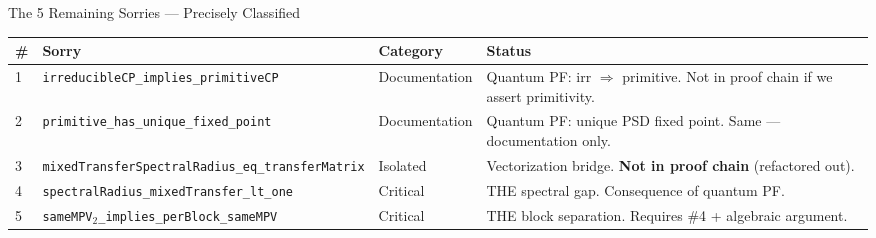 \documentclass[aspectratio=169,10pt]{beamer}
\begin{document}
\begin{frame}{The 5 Remaining Sorries --- Precisely Classified}
\vspace{-0.3em}
\begin{center}
\renewcommand{\arraystretch}{1.25}
{\small
\begin{tabular}{>{\raggedright}p{0.5cm} >{\raggedright}p{4.2cm} >{\raggedright}p{2.2cm} >{\raggedright\arraybackslash}p{4.5cm}}
\hline
\textbf{\#} & \textbf{Sorry} & \textbf{Category} & \textbf{Status} \\
\hline
\textcolor{dimwhite}{1} & \texttt{irreducibleCP\_implies\_\newline primitiveCP} &
  \textcolor{dimwhite}{Documentation} & {\scriptsize Quantum PF: irr $\Rightarrow$ primitive. Not in proof chain if we assert primitivity.} \\
\textcolor{dimwhite}{2} & \texttt{primitive\_has\_unique\_\newline fixed\_point} &
  \textcolor{dimwhite}{Documentation} & {\scriptsize Quantum PF: unique PSD fixed point. Same --- documentation only.} \\
\textcolor{dimwhite}{3} & \texttt{mixedTransferSpectral\newline Radius\_eq\_transferMatrix} &
  \textcolor{dimwhite}{Isolated} & {\scriptsize Vectorization bridge. \textbf{Not in proof chain} (refactored out).} \\
\textcolor{amber}{4} & \texttt{spectralRadius\_mixed\newline Transfer\_lt\_one} &
  \textcolor{amber}{Critical} & {\scriptsize THE spectral gap. Consequence of quantum PF.} \\
\textcolor{softred}{5} & \texttt{sameMPV${}_2$\_implies\_\newline perBlock\_sameMPV} &
  \textcolor{softred}{Critical} & {\scriptsize THE block separation. Requires \#4 + algebraic argument.} \\
\hline
\end{tabular}}
\end{center}

\vspace{0.3em}
\begin{center}
\end{center}
\end{frame}
\end{document}
